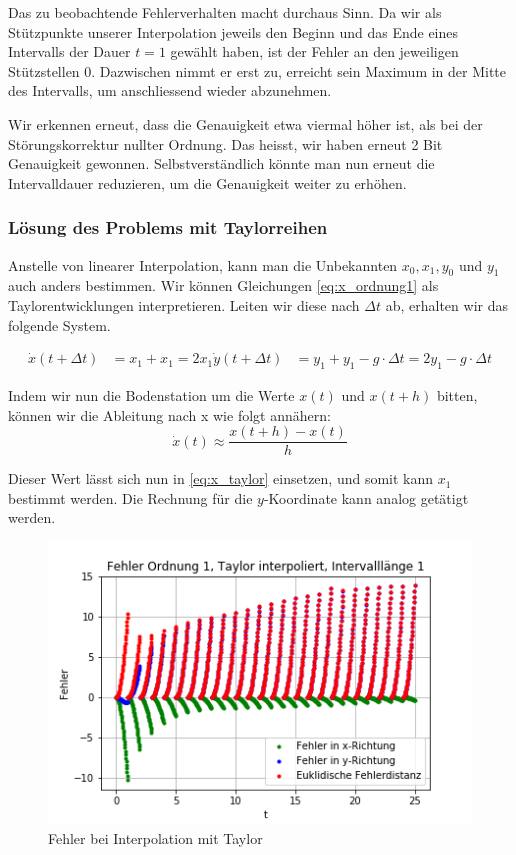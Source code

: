 Das zu beobachtende Fehlerverhalten macht durchaus Sinn. 
Da wir als Stützpunkte unserer Interpolation jeweils den Beginn und das Ende eines Intervalls der Dauer $t=1$ gewählt haben, ist der Fehler an den jeweiligen Stützstellen 0. 
Dazwischen nimmt er erst zu, erreicht sein Maximum in der Mitte des Intervalls, um anschliessend wieder abzunehmen.

Wir erkennen erneut, dass die Genauigkeit etwa viermal höher ist, als bei der Störungskorrektur nullter Ordnung. 
Das heisst, wir haben erneut 2 Bit Genauigkeit gewonnen. 
Selbstverständlich könnte man nun erneut die Intervalldauer reduzieren, um die Genauigkeit weiter zu erhöhen.

\subsubsection{Lösung des Problems mit Taylorreihen}
Anstelle von linearer Interpolation, kann man die Unbekannten $x_0, x_1, y_0$ und $y_1$ auch anders bestimmen. 
Wir können Gleichungen \eqref{eq:x_ordnung1} als Taylorentwicklungen interpretieren. 
Leiten wir diese nach $\Delta t$ ab, erhalten wir das folgende System.

\begin{equation}\label{eq:x_taylor}
\begin{aligned}
\dot{x}(t+ \Delta t) &= x_1 + x_1 = 2x_1
\dot{y}(t+ \Delta t) &= y_1 + y_1 - g \cdot \Delta t = 2y_1 - g \cdot \Delta t
\end{aligned}
\end{equation}

Indem wir nun die Bodenstation um die Werte $x(t)$ und $x(t+h)$ bitten, können wir die Ableitung nach x wie folgt annähern:
\[
    \dot{x}(t) \approx \frac{x(t+h) - x(t)}{h}
\]

Dieser Wert lässt sich nun in \eqref{eq:x_taylor} einsetzen, und somit kann $x_1$ bestimmt werden. 
Die Rechnung für die $y$-Koordinate kann analog getätigt werden.

\begin{figure}
    \centering
    \includegraphics[scale = 0.7]{papers/perturbation/bilder/taylor_error.png}
    \caption{Fehler bei Interpolation mit Taylor}
	\label{errorOrdnung1Taylor}
\end{figure}

